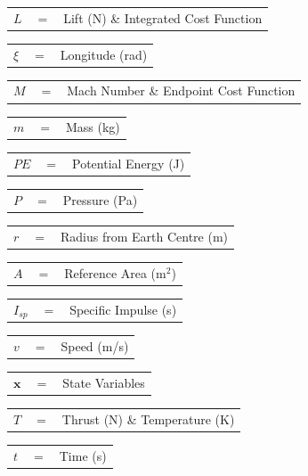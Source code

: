 \begin{tabular}{p{0.8cm}p{0.8cm}p{5.6cm}}
	$L$ & $=$ & Lift (N) \& Integrated Cost Function\\
\end{tabular} 
\begin{tabular}{p{0.8cm}p{0.8cm}p{5.6cm}}
	$\xi$ & $=$ & Longitude (rad)\\
\end{tabular} 
\begin{tabular}{p{0.8cm}p{0.8cm}p{5.6cm}}
	$M$ & $=$ & Mach Number \& Endpoint Cost Function\\
\end{tabular}
\begin{tabular}{p{0.8cm}p{0.8cm}p{5.6cm}}
	$m$ & $=$ & Mass (kg)\\
\end{tabular} 
\begin{tabular}{p{0.8cm}p{0.8cm}p{5.6cm}}
	$PE$ & $=$ & Potential Energy (J)\\
\end{tabular} 
\begin{tabular}{p{0.8cm}p{0.8cm}p{5.6cm}}
	$P$ & $=$ & Pressure (Pa)  \\
\end{tabular}
\begin{tabular}{p{0.8cm}p{0.8cm}p{5.6cm}}
	$r$ & $=$ & Radius from Earth Centre (m)\\
\end{tabular} 
\begin{tabular}{p{0.8cm}p{0.8cm}p{5.6cm}}
	$A$ & $=$ & Reference Area (m$^2$)\\
\end{tabular} 
\begin{tabular}{p{0.8cm}p{0.8cm}p{5.6cm}}
	$I_{sp}$ & $=$ & Specific Impulse (s)\\ 
\end{tabular} 
\begin{tabular}{p{0.8cm}p{0.8cm}p{5.6cm}}
	$v$ & $=$ & Speed (m/s)\\
\end{tabular} 
\begin{tabular}{p{0.8cm}p{0.8cm}p{5.6cm}}
	$\textbf{x}$& $=$ & State Variables\\
\end{tabular} 
\begin{tabular}{p{0.8cm}p{0.8cm}p{5.6cm}}
	$T$ & $=$ & Thrust (N) \& Temperature (K)\\
\end{tabular} 
\begin{tabular}{p{0.8cm}p{0.8cm}p{5.6cm}}
	$t$ & $=$ & Time (s)\\
\end{tabular} 
